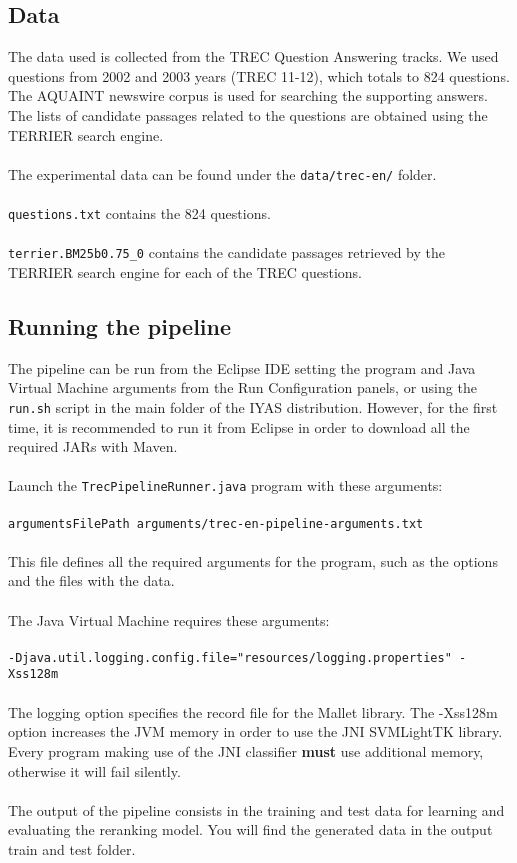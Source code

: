 \documentclass{wileysev}
\begin{document}
\subsection{Data}

The data used is collected from the TREC Question Answering tracks. We used questions from 2002 and 2003 years (TREC 11-12), which totals to 824 questions. The AQUAINT newswire corpus is used for searching the supporting answers. The lists of candidate passages related to the questions are obtained using the TERRIER search engine.
\\\\
The experimental data can be found under the \texttt{data/trec-en/} folder.
\\\\
\texttt{questions.txt} contains the 824 questions.
\\\\
\texttt{terrier.BM25b0.75\_0} contains the candidate passages retrieved by the TERRIER search engine for each of the TREC questions.

\subsection{Running the pipeline}

The pipeline can be run from the Eclipse IDE setting the program and Java Virtual Machine arguments from the Run Configuration panels, or using the \texttt{run.sh} script in the main folder of the IYAS distribution. However, for the first time, it is recommended to run it from Eclipse in order to download all the required JARs with Maven.
\\\\
Launch the \texttt{TrecPipelineRunner.java} program with these arguments:
\\\\
\texttt{argumentsFilePath arguments/trec-en-pipeline-arguments.txt}
\\\\
This file defines all the required arguments for the program, such as the options and the files with the data.
\\\\
The Java Virtual Machine requires these arguments:
\\\\
\texttt{-Djava.util.logging.config.file="resources/logging.properties" -Xss128m}
\\\\
The logging option specifies the record file for the Mallet library. The -Xss128m option increases the JVM memory in order to use the JNI SVMLightTK library. Every program making use of the JNI classifier \textbf{must} use additional memory, otherwise it will fail silently.
\\\\
The output of the pipeline consists in the training and test data for learning and evaluating the reranking model. You will find the generated data in the output train and test folder.
\end{document}
